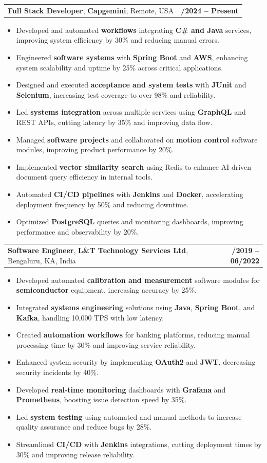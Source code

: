 \documentclass[letterpaper,11pt]{article}
\makeatletter
\newcommand{\resumeItem}[1]{
  \item\footnotesize{
    {#1 \vspace{-2pt}}
  }
}
\newcommand{\resumeSubheading}[4]{
  \vspace{-2pt}\item
    \begin{tabular*}{1.0\textwidth}[t]{l@{\extracolsep{\fill}}r}
      \textbf{\fontsize{10pt}{14pt}\selectfont #3}, \textbf{\fontsize{10pt}{14pt}\selectfont #1}, \fontsize{10pt}{14pt}\selectfont #4 & \textbf{\fontsize{10pt}{14pt}\selectfont #2} \\
    \end{tabular*}\vspace{-7pt}
}
\newcommand{\resumeItemListStart}{\begin{itemize}[leftmargin=*]}
\newcommand{\resumeItemListEnd}{\end{itemize}\vspace{-5pt}}
\makeatother
\begin{document}
    \resumeSubheading
        {Capgemini}{01/2024 -- Present}
        {Full Stack Developer}{Remote, USA}
      \resumeItemListStart
        \resumeItem{Developed and automated \textbf{workflows} integrating \textbf{C\# and Java} services, improving system efficiency by 30\% and reducing manual errors.}
        \resumeItem{Engineered \textbf{software systems} with \textbf{Spring Boot} and \textbf{AWS}, enhancing system scalability and uptime by 25\% across critical applications.}
        \resumeItem{Designed and executed \textbf{acceptance and system tests} with \textbf{JUnit} and \textbf{Selenium}, increasing test coverage to over 98\% and reliability.}
        \resumeItem{Led \textbf{systems integration} across multiple services using \textbf{GraphQL} and REST APIs, cutting latency by 35\% and improving data flow.}
        \resumeItem{Managed \textbf{software projects} and collaborated on \textbf{motion control} software modules, improving product performance by 20\%.}
        \resumeItem{Implemented \textbf{vector similarity search} using Redis to enhance AI-driven document query efficiency in internal tools.}
        \resumeItem{Automated \textbf{CI/CD pipelines} with \textbf{Jenkins} and \textbf{Docker}, accelerating deployment frequency by 50\% and reducing downtime.}
        \resumeItem{Optimized \textbf{PostgreSQL} queries and monitoring dashboards, improving performance and observability by 20\%.}
      \resumeItemListEnd

    \resumeSubheading
        {L\&T Technology Services Ltd}{08/2019 -- 06/2022}
        {Software Engineer}{Bengaluru, KA, India}
      \resumeItemListStart
        \resumeItem{Developed automated \textbf{calibration and measurement} software modules for \textbf{semiconductor} equipment, increasing accuracy by 25\%.}
        \resumeItem{Integrated \textbf{systems engineering} solutions using \textbf{Java}, \textbf{Spring Boot}, and \textbf{Kafka}, handling 10,000 TPS with low latency.}
        \resumeItem{Created \textbf{automation workflows} for banking platforms, reducing manual processing time by 30\% and improving service reliability.}
        \resumeItem{Enhanced system security by implementing \textbf{OAuth2} and \textbf{JWT}, decreasing security incidents by 40\%.}
        \resumeItem{Developed \textbf{real-time monitoring} dashboards with \textbf{Grafana} and \textbf{Prometheus}, boosting issue detection speed by 35\%.}
        \resumeItem{Led \textbf{system testing} using automated and manual methods to increase quality assurance and reduce bugs by 28\%.}
        \resumeItem{Streamlined \textbf{CI/CD} with \textbf{Jenkins} integrations, cutting deployment times by 30\% and improving release reliability.}
      \resumeItemListEnd
\end{document}
